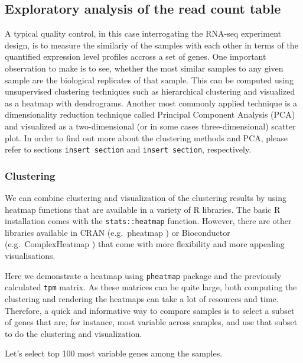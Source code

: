 \documentclass[12pt,]{krantz}
\begin{document}
\hypertarget{exploratory-analysis-of-the-read-count-table}{%
\subsection{Exploratory analysis of the read count table}\label{exploratory-analysis-of-the-read-count-table}}

A typical quality control, in this case interrogating the RNA-seq experiment design, is to measure the similariy of the samples with each other in terms of the quantified expression level profiles accross a set of genes. One important observation to make is to see, whether the most similar samples to any given sample are the biological replicates of that sample. This can be computed using unsupervised clustering techniques such as hierarchical clustering and visualized as a heatmap with dendrograms. Another most commonly applied technique is a dimensionality reduction technique called Principal Component Analysis (PCA) and visualized as a two-dimensional (or in some cases three-dimensional) scatter plot. In order to find out more about the clustering methods and PCA, please refer to sections \texttt{insert\ section} and \texttt{insert\ section}, respectively.

\hypertarget{clustering}{%
\subsubsection{Clustering}\label{clustering}}

We can combine clustering and visualization of the clustering results by using heatmap functions that are available in a variety of R libraries. The basic R installation comes with the \texttt{stats::heatmap} function. However, there are other libraries available in CRAN (e.g.~pheatmap \citep{pheatmap}) or Bioconductor (e.g.~ComplexHeatmap \citep{gu_complex_2016}) that come with more flexibility and more appealing visualisations.

Here we demonstrate a heatmap using \texttt{pheatmap} package and the previously calculated \texttt{tpm} matrix.
As these matrices can be quite large, both computing the clustering and rendering the heatmaps can take a lot of resources and time. Therefore, a quick and informative way to compare samples is to select a subset of genes that are, for instance, most variable across samples, and use that subset to do the clustering and visualization.

Let's select top 100 most variable genes among the samples.
\end{document}

